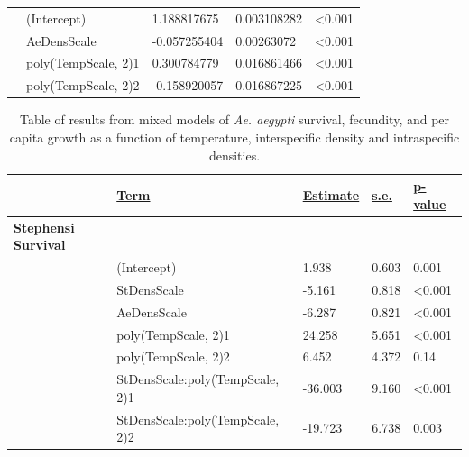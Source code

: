 \documentclass[12pt,]{article}
\begin{document}
\begin{table}[]
\begin{tabular}{lllll}
                & (Intercept)                   & 1.188817675             & 0.003108282         & \textless0.001         \\
                & AeDensScale                   & -0.057255404            & 0.00263072          & \textless0.001         \\
                & poly(TempScale, 2)1           & 0.300784779             & 0.016861466         & \textless0.001         \\
                & poly(TempScale, 2)2           & -0.158920057            & 0.016867225         & \textless0.001
\end{tabular}
\end{table}

\begin{table}[]
\centering
\caption{Table of results from mixed models of \textit{Ae. aegypti} survival, fecundity, and per capita growth as a function of temperature, interspecific density and intraspecific densities. }
\label{ref:tab2}
\begin{tabular}{lllll}
                             & {\ul \textbf{Term}}             & {\ul \textbf{Estimate}} & {\ul \textbf{s.e.}} & {\ul \textbf{p-value}} \\
\hline
\textbf{Stephensi Survival}  &                                 &                         &                     &                        \\
                             & (Intercept)                     & 1.938                   & 0.603               & 0.001                  \\
                             & StDensScale                     & -5.161                  & 0.818               & \textless0.001         \\
                             & AeDensScale                     & -6.287                  & 0.821               & \textless0.001         \\
                             & poly(TempScale, 2)1             & 24.258                  & 5.651               & \textless0.001         \\
                             & poly(TempScale, 2)2             & 6.452                   & 4.372               & 0.14                   \\
                             & StDensScale:poly(TempScale, 2)1 & -36.003                 & 9.160               & \textless0.001         \\
                             & StDensScale:poly(TempScale, 2)2 & -19.723                 & 6.738               & 0.003                  \\

\end{tabular}
\end{table}
\end{document}
